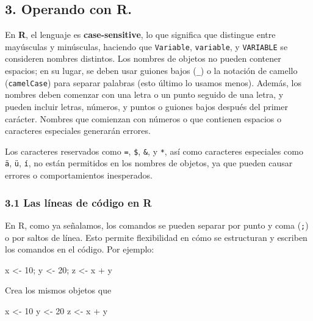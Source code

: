 \documentclass[
  letterpaper,
  DIV=11,
  numbers=noendperiod]{scrartcl}
\newenvironment{Shaded}{\begin{snugshade}}{\end{snugshade}}
\newcommand{\DecValTok}[1]{\textcolor[rgb]{0.68,0.00,0.00}{#1}}
\newcommand{\NormalTok}[1]{\textcolor[rgb]{0.00,0.23,0.31}{#1}}
\newcommand{\OtherTok}[1]{\textcolor[rgb]{0.00,0.23,0.31}{#1}}
\newcommand{\SpecialCharTok}[1]{\textcolor[rgb]{0.37,0.37,0.37}{#1}}
\begin{document}
\hypertarget{operando-con-r.}{%
\subsection{3. Operando con R.}\label{operando-con-r.}}

En \textbf{R}, el lenguaje es \textbf{case-sensitive}, lo que significa
que distingue entre mayúsculas y minúsculas, haciendo que
\texttt{Variable}, \texttt{variable}, y \texttt{VARIABLE} se consideren
nombres distintos. Los nombres de objetos no pueden contener espacios;
en su lugar, se deben usar guiones bajos (\texttt{\_}) o la notación de
camello (\texttt{camelCase}) para separar palabras (esto último lo
usamos menos). Además, los nombres deben comenzar con una letra o un
punto seguido de una letra, y pueden incluir letras, números, y puntos o
guiones bajos después del primer carácter. Nombres que comienzan con
números o que contienen espacios o caracteres especiales generarán
errores.

Los caracteres reservados como \texttt{=}, \texttt{\$}, \texttt{\&}, y
\texttt{*}, así como caracteres especiales como \texttt{ä}, \texttt{ü},
\texttt{í}, no están permitidos en los nombres de objetos, ya que pueden
causar errores o comportamientos inesperados.

\hypertarget{las-luxedneas-de-cuxf3digo-en-r}{%
\subsubsection{3.1 Las líneas de código en
R}\label{las-luxedneas-de-cuxf3digo-en-r}}

En R, como ya señalamos, los comandos se pueden separar por punto y coma
(\texttt{;}) o por saltos de línea. Esto permite flexibilidad en cómo se
estructuran y escriben los comandos en el código. Por ejemplo:

\begin{Shaded}
\begin{Highlighting}[]
\NormalTok{x }\OtherTok{\textless{}{-}} \DecValTok{10}\NormalTok{; y }\OtherTok{\textless{}{-}} \DecValTok{20}\NormalTok{; z }\OtherTok{\textless{}{-}}\NormalTok{ x }\SpecialCharTok{+}\NormalTok{ y}
\end{Highlighting}
\end{Shaded}

Crea los mismos objetos que

\begin{Shaded}
\begin{Highlighting}[]
\NormalTok{x }\OtherTok{\textless{}{-}} \DecValTok{10}
\NormalTok{y }\OtherTok{\textless{}{-}} \DecValTok{20}
\NormalTok{z }\OtherTok{\textless{}{-}}\NormalTok{ x }\SpecialCharTok{+}\NormalTok{ y}
\end{Highlighting}
\end{Shaded}
\end{document}
